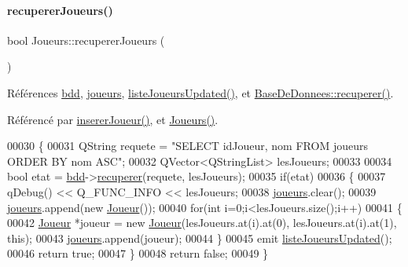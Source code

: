 \paragraph{\texorpdfstring{recuperer\+Joueurs()}{recupererJoueurs()}}
{\footnotesize\ttfamily bool Joueurs\+::recuperer\+Joueurs (\begin{DoxyParamCaption}{ }\end{DoxyParamCaption})}



Références \hyperlink{class_joueurs_ac060c3017311b67a97ed488ce2bb2332}{bdd}, \hyperlink{class_joueurs_a86c2a21b5a6b83f9a43f9a957a020fd7}{joueurs}, \hyperlink{class_joueurs_a5df3ead7bec2c66c600ec53880afe035}{liste\+Joueurs\+Updated()}, et \hyperlink{class_base_de_donnees_a77539baad389f5acf754cd2cd452403e}{Base\+De\+Donnees\+::recuperer()}.



Référencé par \hyperlink{class_joueurs_ad41325dbd0611773c6e9fd8a814be1b3}{inserer\+Joueur()}, et \hyperlink{class_joueurs_ac0f9bfbacdcda2622d7438d0445200e8}{Joueurs()}.


\begin{DoxyCode}
00030 \{
00031     QString requete = \textcolor{stringliteral}{"SELECT idJoueur, nom FROM joueurs ORDER BY nom ASC"};
00032     QVector<QStringList> lesJoueurs;
00033 
00034     \textcolor{keywordtype}{bool} etat = \hyperlink{class_joueurs_ac060c3017311b67a97ed488ce2bb2332}{bdd}->\hyperlink{class_base_de_donnees_a77539baad389f5acf754cd2cd452403e}{recuperer}(requete, lesJoueurs);
00035     \textcolor{keywordflow}{if}(etat)
00036     \{
00037         qDebug() << Q\_FUNC\_INFO << lesJoueurs;
00038         \hyperlink{class_joueurs_a86c2a21b5a6b83f9a43f9a957a020fd7}{joueurs}.clear();
00039         \hyperlink{class_joueurs_a86c2a21b5a6b83f9a43f9a957a020fd7}{joueurs}.append(\textcolor{keyword}{new} \hyperlink{class_joueur}{Joueur}());
00040         \textcolor{keywordflow}{for}(\textcolor{keywordtype}{int} i=0;i<lesJoueurs.size();i++)
00041         \{
00042             \hyperlink{class_joueur}{Joueur} *joueur = \textcolor{keyword}{new} \hyperlink{class_joueur}{Joueur}(lesJoueurs.at(i).at(0), lesJoueurs.at(i).at(1), \textcolor{keyword}{this});
00043             \hyperlink{class_joueurs_a86c2a21b5a6b83f9a43f9a957a020fd7}{joueurs}.append(joueur);
00044         \}
00045         emit \hyperlink{class_joueurs_a5df3ead7bec2c66c600ec53880afe035}{listeJoueursUpdated}();
00046         \textcolor{keywordflow}{return} \textcolor{keyword}{true};
00047     \}
00048     \textcolor{keywordflow}{return} \textcolor{keyword}{false};
00049 \}
\end{DoxyCode}


